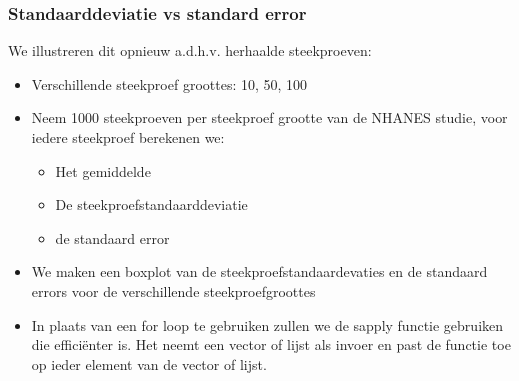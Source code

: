 \documentclass[
  dutch,
  letterpaper,
  12pt]{book}
\providecommand{\tightlist}{%
  \setlength{\itemsep}{0pt}\setlength{\parskip}{0pt}}
\theoremstyle{definition}
\theoremstyle{definition}
\theoremstyle{definition}
\theoremstyle{remark}
\begin{document}
\subsubsection{Standaarddeviatie vs standard
error}\label{standaarddeviatie-vs-standard-error}

We illustreren dit opnieuw a.d.h.v. herhaalde steekproeven:

\begin{itemize}
\item
  Verschillende steekproef groottes: 10, 50, 100
\item
  Neem 1000 steekproeven per steekproef grootte van de NHANES studie,
  voor iedere steekproef berekenen we:

  \begin{itemize}
  \tightlist
  \item
    Het gemiddelde
  \item
    De steekproefstandaarddeviatie
  \item
    de standaard error
  \end{itemize}
\item
  We maken een boxplot van de steekproefstandaardevaties en de standaard
  errors voor de verschillende steekproefgroottes
\item
  In plaats van een for loop te gebruiken zullen we de sapply functie
  gebruiken die efficiënter is. Het neemt een vector of lijst als invoer
  en past de functie toe op ieder element van de vector of lijst.
\end{itemize}
\end{document}

